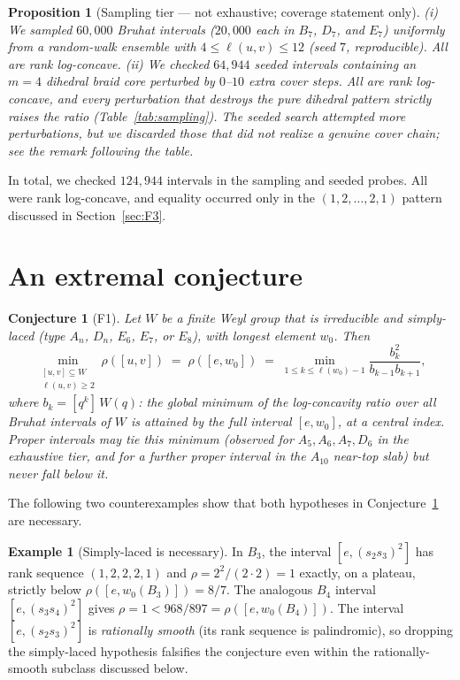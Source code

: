 \documentclass[11pt]{amsart}
\theoremstyle{plain}
\newtheorem{proposition}[theorem]{Proposition}
\newtheorem{conjecture}[theorem]{Conjecture}
\theoremstyle{definition}
\newtheorem{example}[theorem]{Example}
\theoremstyle{remark}
\newcommand{\W}{W}
\begin{document}
\begin{proposition}[Sampling tier --- not exhaustive; coverage statement only]
\label{thm:V3}
\textup{(i)} We sampled $60{,}000$ Bruhat intervals ($20{,}000$ each in
$B_7$, $D_7$, and $E_7$) uniformly from a random-walk ensemble with
$4\le\ell(u,v)\le 12$ (seed $7$, reproducible). All are rank
log-concave. \textup{(ii)} We checked $64{,}944$ seeded intervals
containing an $m=4$ dihedral braid core perturbed by $0$--$10$ extra cover
steps. All are rank log-concave, and every perturbation that destroys the
pure dihedral pattern strictly raises the ratio
(Table~\ref{tab:sampling}). The seeded search attempted more
perturbations, but we discarded those that did not realize a genuine cover
chain; see the remark following the table.
\end{proposition}

In total, we checked $124{,}944$ intervals in the sampling and seeded
probes. All were rank log-concave, and equality occurred only in the
$(1,2,\dots,2,1)$ pattern discussed in Section~\ref{sec:F3}.

\section{An extremal conjecture}
\label{sec:F1}

\begin{conjecture}[F1]
\label{conj:F1}
Let $\W$ be a finite Weyl group that is \emph{irreducible} and
\emph{simply-laced} (type $A_n$, $D_n$, $E_6$, $E_7$, or $E_8$), with
longest element $w_0$. Then
\[
\min_{\substack{[u,v]\subseteq \W \\ \ell(u,v)\ge 2}} \rho([u,v])
\;=\; \rho([e,w_0])
\;=\; \min_{1\le k\le \ell(w_0)-1} \frac{b_k^2}{b_{k-1}b_{k+1}},
\]
where $b_k=[q^k]\,W(q)$: the global minimum of the log-concavity ratio over
\emph{all} Bruhat intervals of $\W$ is attained by the full interval
$[e,w_0]$, at a central index. Proper intervals may tie this minimum
(observed for $A_5,A_6,A_7,D_6$ in the exhaustive tier, and for a further
proper interval in the $A_{10}$ near-top slab) but never fall below it.
\end{conjecture}

The following two counterexamples show that both hypotheses in
Conjecture~\ref{conj:F1} are necessary.

\begin{example}[Simply-laced is necessary]
\label{ex:F1-simplylaced}
In $B_3$, the interval $[e,(s_2s_3)^2]$ has rank sequence $(1,2,2,2,1)$ and
$\rho=2^2/(2\cdot2)=1$ exactly, on a plateau, strictly below
$\rho([e,w_0(B_3)])=8/7$. The analogous $B_4$ interval
$[e,(s_3s_4)^2]$ gives $\rho=1<968/897=\rho([e,w_0(B_4)])$. The interval $[e,(s_2s_3)^2]$ is \emph{rationally smooth} (its rank
sequence is palindromic), so dropping the simply-laced hypothesis
falsifies the conjecture even within the rationally-smooth subclass
discussed below.
\end{example}
\end{document}

